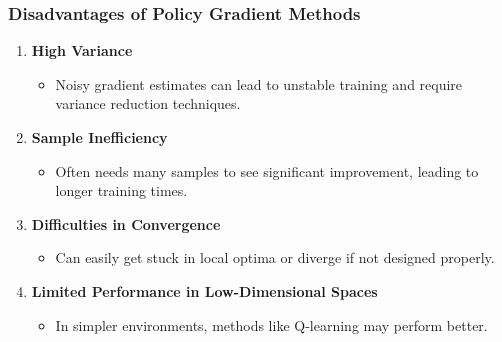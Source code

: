 \documentclass[aspectratio=169]{beamer}
\begin{document}
\begin{frame}[fragile]
    \frametitle{Disadvantages of Policy Gradient Methods}
    \begin{enumerate}
        \item \textbf{High Variance}
            \begin{itemize}
                \item Noisy gradient estimates can lead to unstable training and require variance reduction techniques.
            \end{itemize}
        \item \textbf{Sample Inefficiency}
            \begin{itemize}
                \item Often needs many samples to see significant improvement, leading to longer training times.
            \end{itemize}
        \item \textbf{Difficulties in Convergence}
            \begin{itemize}
                \item Can easily get stuck in local optima or diverge if not designed properly.
            \end{itemize}
        \item \textbf{Limited Performance in Low-Dimensional Spaces}
            \begin{itemize}
                \item In simpler environments, methods like Q-learning may perform better.
            \end{itemize}
    \end{enumerate}
\end{frame}
\end{document}
